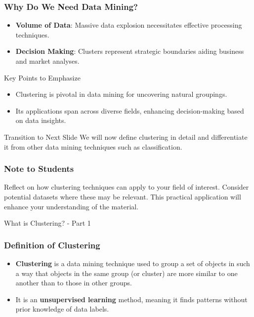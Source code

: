 \documentclass[aspectratio=169]{beamer}
\begin{document}
\begin{frame}[fragile]
    \frametitle{Why Do We Need Data Mining?}
    \begin{itemize}
        \item \textbf{Volume of Data}: Massive data explosion necessitates effective processing techniques.
        \item \textbf{Decision Making}: Clusters represent strategic boundaries aiding business and market analyses.
    \end{itemize}

    \begin{block}{Key Points to Emphasize}
        \begin{itemize}
            \item Clustering is pivotal in data mining for uncovering natural groupings.
            \item Its applications span across diverse fields, enhancing decision-making based on data insights.
        \end{itemize}
    \end{block}

    \begin{block}{Transition to Next Slide}
        We will now define clustering in detail and differentiate it from other data mining techniques such as classification.
    \end{block}
\end{frame}

\begin{frame}[fragile]
    \frametitle{Note to Students}
    Reflect on how clustering techniques can apply to your field of interest. Consider potential datasets where these may be relevant. This practical application will enhance your understanding of the material.
\end{frame}

\begin{frame}[fragile]{What is Clustering? - Part 1}
    \frametitle{Definition of Clustering}
    \begin{itemize}
        \item \textbf{Clustering} is a data mining technique used to group a set of objects in such a way that 
              objects in the same group (or cluster) are more similar to one another than to those in other groups.
        \item It is an \textbf{unsupervised learning} method, meaning it finds patterns without prior knowledge of data labels.
    \end{itemize}
\end{frame}
\end{document}
